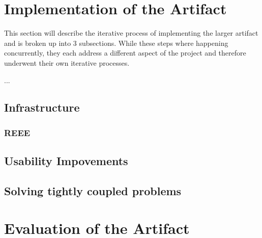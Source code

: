\newpage


\section{Implementation of the Artifact}

This section will describe the iterative process of implementing the larger artifact and is broken up into 3 subsections.
While these steps where happening concurrently, they each address a different aspect of the project and therefore underwent their own iterative processes.

...

\subsection{Infrastructure}

\subsubsection*{REEE}

\subsection{Usability Impovements}

\subsection{Solving tightly coupled problems} 


\newpage


\section{Evaluation of the Artifact}

\newpage
